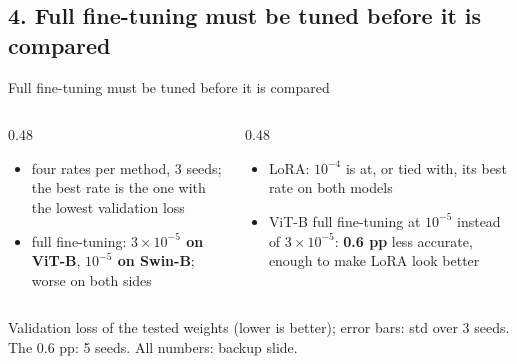 \documentclass[aspectratio=169,11pt]{beamer}
\newcommand{\figH}{5.0cm}
\newcommand{\src}[1]{\par\vfill{\tiny\color{cGrey}#1\par}}
\begin{document}
\subsection{4. Full fine-tuning must be tuned before it is compared}
\begin{frame}{Full fine-tuning must be tuned before it is compared}
\vspace{-1mm}
{\renewcommand{\figH}{4.2cm}\centering\par}
\vspace{-1mm}
\begin{columns}[T]
\begin{column}{0.48\textwidth}
\footnotesize
\begin{itemize}
  \item four rates per method, 3 seeds; the best rate is the one with the lowest validation loss
  \item full fine-tuning: \textbf{$3{\times}10^{-5}$ on ViT-B}, \textbf{$10^{-5}$ on Swin-B}; worse on both sides
\end{itemize}
\end{column}
\begin{column}{0.48\textwidth}
\footnotesize
\begin{itemize}
  \item LoRA: $10^{-4}$ is at, or tied with, its best rate on both models
  \item ViT-B full fine-tuning at $10^{-5}$ instead of $3{\times}10^{-5}$: \textbf{0.6 pp} less accurate, enough to make LoRA look better
\end{itemize}
\end{column}
\end{columns}
\src{Validation loss of the tested weights (lower is better); error bars: std over 3 seeds. The 0.6 pp: 5 seeds. All numbers: backup slide.}
\end{frame}

\end{document}
